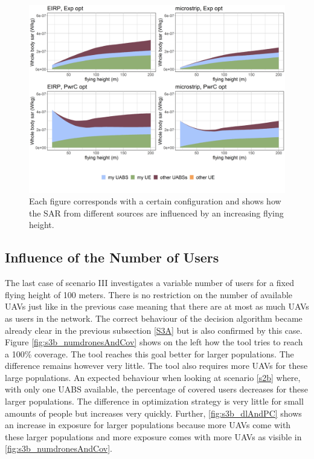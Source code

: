 \begin{figure}[]
  \includegraphics[width=\textwidth]{../results/s3/fhFourSources.png}
  \caption{
  Each figure corresponds with a certain configuration and shows how the \gls{SAR} from different sources are influenced by an increasing flying height.}  
  \label{fig:s3a_fourSourcesMatrix}
\end{figure}

\FloatBarrier
\subsection{Influence of the Number of Users}
\label{S3B}

The last case of scenario III investigates a variable number of users for a fixed flying height of 100 meters. There is no 
restriction on the number of available \gls{UAV}s just like in the previous case meaning that there are at most 
as much \gls{UAV}s as users in the network. The correct behaviour of the decision algorithm became already clear in the previous subsection \ref{S3A} but is also
confirmed by this case.
Figure \ref{fig:s3b_numdronesAndCov} shows on the left how the tool tries to reach a 100\% coverage. The tool reaches this goal 
better for larger populations. The difference remains however very little. The tool also requires more \gls{UAV}s for these large 
populations. An expected behaviour  when looking at scenario \ref{s2b} where, with only one \gls{UABS} available, the percentage of covered users decreases for these larger populations.
 The difference in optimization strategy is very little for small amounts of people but increases very quickly. Further, \ref{fig:s3b_dlAndPC} shows an increase 
 in exposure for larger populations because more \gls{UAV}s come with these larger populations and more 
 exposure comes with more \gls{UAV}s as visible in \ref{fig:s3b_numdronesAndCov}.

